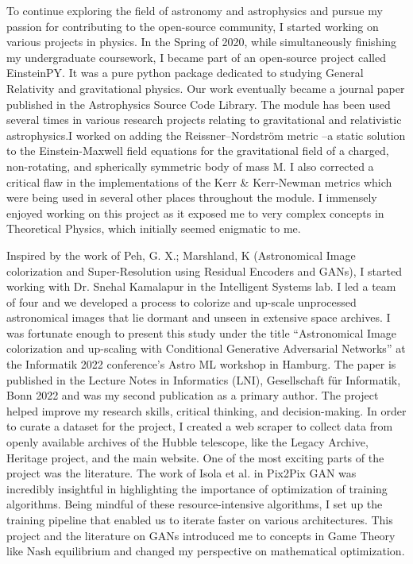 \documentclass{article}
\begin{document}
To continue exploring the field of astronomy and astrophysics and pursue my
passion for contributing to the open-source community, I started working on
various projects in physics. In the Spring of 2020, while simultaneously
finishing my undergraduate coursework, I became part of an open-source project
called EinsteinPY. It was a pure python package dedicated to studying General
Relativity and gravitational physics. Our work eventually became a journal
paper published in the Astrophysics Source Code Library. The module has been
used several times in various research projects relating to gravitational and
relativistic astrophysics.I worked on adding the Reissner–Nordström metric --a
static solution to the Einstein-Maxwell field equations for the gravitational
field of a charged, non-rotating, and spherically symmetric body of mass M. I
also corrected a critical flaw in the implementations of the Kerr \&
Kerr-Newman metrics which were being used in several other places throughout
the module. I immensely enjoyed working on this project as it exposed me to
very complex concepts in Theoretical Physics, which initially seemed enigmatic
to me. 
\vspace{6pt}

Inspired by the work of Peh, G. X.; Marshland, K (Astronomical Image
colorization and Super-Resolution using Residual Encoders and GANs), I started
working with Dr. Snehal Kamalapur in the Intelligent Systems lab. I led a team
of four and we developed a process to colorize and up-scale unprocessed
astronomical images that lie dormant and unseen in extensive space archives. I
was fortunate enough to present this study under the title “Astronomical Image
colorization and up-scaling with Conditional Generative Adversarial Networks”
at the Informatik 2022 conference’s Astro ML workshop in Hamburg. The paper is
published in the Lecture Notes in Informatics (LNI), Gesellschaft für
Informatik, Bonn 2022 and was my second publication as a primary author. The
project helped improve my research skills, critical thinking, and
decision-making. In order to curate a dataset for the project, I created a web
scraper to collect data from openly available archives of the Hubble telescope,
like the Legacy Archive, Heritage project, and the main website. One of the
most exciting parts of the project was the literature. The work of Isola et al.
in Pix2Pix GAN was incredibly insightful in highlighting the importance of
optimization of training algorithms. Being mindful of these resource-intensive
algorithms, I set up the training pipeline that enabled us to iterate faster on
various architectures. This project and the literature on GANs introduced me to
concepts in Game Theory like Nash equilibrium and changed my perspective on
mathematical optimization.
\vspace{6pt}
\end{document}

